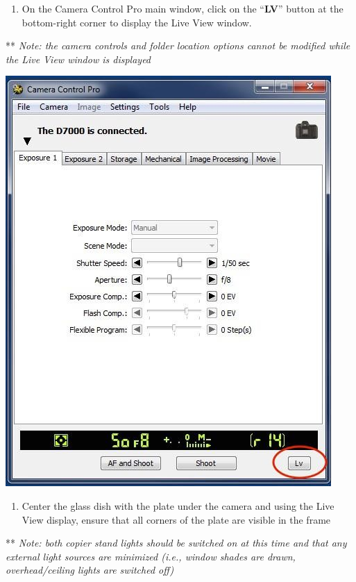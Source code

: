 \documentclass[
]{book}
\providecommand{\tightlist}{%
  \setlength{\itemsep}{0pt}\setlength{\parskip}{0pt}}
\begin{document}
\begin{enumerate}
\def\labelenumi{\arabic{enumi}.}
\setcounter{enumi}{8}
\tightlist
\item
  On the Camera Control Pro main window, click on the ``\textbf{LV}'' button at the bottom-right corner to display the Live View window.
\end{enumerate}

** \emph{Note: the camera controls and folder location options cannot be modified while the Live View window is displayed}

\includegraphics{images/Camera14.jpg}

\begin{enumerate}
\def\labelenumi{\arabic{enumi}.}
\setcounter{enumi}{9}
\tightlist
\item
  Center the glass dish with the plate under the camera and using the Live View display, ensure that all corners of the plate are visible in the frame
\end{enumerate}

** \emph{Note: both copier stand lights should be switched on at this time and that any external light sources are minimized (i.e., window shades are drawn, overhead/ceiling lights are switched off)}
\end{document}

